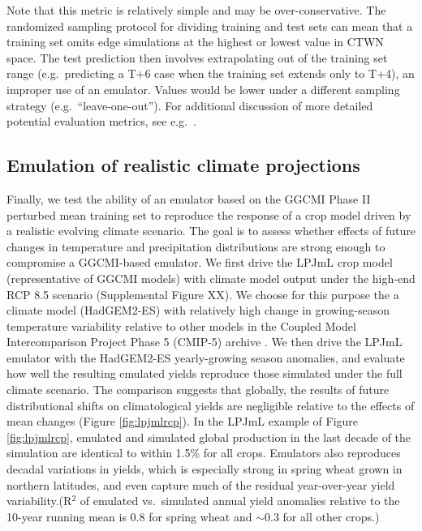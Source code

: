 \documentclass[gmd, manuscript]{copernicus} %
\begin{document}
Note that this metric is relatively simple and may be over-conservative.
The randomized sampling protocol for dividing training and test sets can mean that a training set omits edge simulations at the highest or lowest value in CTWN space. 
The test prediction then involves extrapolating out of the training set range (e.g.\ predicting a T+6 case when the training set extends only to T+4), an improper use of an emulator. 
Values would be lower under a different sampling strategy (e.g.\ ``leave-one-out''). 
For additional discussion of more detailed potential evaluation metrics, see e.g.\ \citet{Castruccio14}.

\smallskip
\label{S:4.3}
\subsection{Emulation of realistic climate projections}
Finally, we test the ability of an emulator based on the GGCMI Phase II perturbed mean training set to reproduce the response of a crop model driven by a realistic evolving climate scenario. The goal is to assess whether effects of future changes in temperature and precipitation distributions  are strong enough to compromise a GGCMI-based emulator.
We first drive the LPJmL crop model (representative of GGCMI  models) with climate model output under the high-end RCP 8.5 scenario (Supplemental Figure XX).
We choose for this purpose the a  climate model (HadGEM2-ES) with relatively high change in growing-season temperature variability relative to other models in the Coupled Model Intercomparison Project Phase 5 (CMIP-5) archive \citep{Jones2011h, Martin2011}. 
We then drive the LPJmL emulator with the HadGEM2-ES yearly-growing season anomalies, and evaluate how well the resulting emulated yields reproduce those simulated under the full climate scenario. 
The comparison suggests that globally, the results of future distributional shifts on climatological yields are negligible relative to the effects of mean changes (Figure \ref{fig:lpjmlrcp}). 
In the LPJmL example of Figure \ref{fig:lpjmlrcp}, emulated and simulated global production in the last decade of the simulation are identical to within 1.5\% for all crops.
Emulators also reproduces decadal variations in yields, which is especially strong in spring wheat grown in northern latitudes, and even capture much of the residual year-over-year yield variability.(R$^2$ of emulated vs.\ simulated annual yield anomalies relative to the 10-year running mean is 0.8 for spring wheat and $\sim$0.3 for all other crops.)
\end{document}

